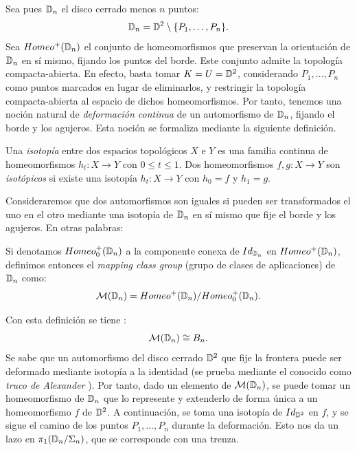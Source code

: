 \documentclass[TFG.tex]{subfiles}
\begin{document}
Sea pues $\mathbb{D}_n$ el disco cerrado menos $n$ puntos:
$$\mathbb{D}_n=\mathbb{D}^2\setminus\{P_1,\dots, P_n\}.$$
Sea $Homeo^+(\mathbb{D}_n)$ el conjunto de homeomorfismos que preservan la orientación de $\mathbb{D}_n$ en sí mismo, fijando los puntos del borde. Este conjunto admite la topología compacta-abierta. En efecto, basta tomar $K=U=\mathbb{D}^2$, considerando $P_1,\dots, P_n$ como puntos marcados en lugar de eliminarlos, y restringir la topología compacta-abierta al espacio de dichos homeomorfismos. Por tanto, tenemos una noción natural de \emph{deformación continua} de un automorfismo de $\mathbb{D}_n$, fijando el borde y los agujeros. Esta noción se formaliza mediante la siguiente definición.

\begin{defi}
Una \emph{isotopía} entre dos espacios topológicos $X$ e $Y$ es una familia continua de homeomorfismos $h_t:X\to Y$ con $0\leq t\leq 1$. Dos homeomorfismos $f,g:X\to Y$ son \emph{isotópicos} si existe una isotopía $h_t:X\to Y$ con $h_0=f$ y $h_1=g$. 
\end{defi}

Consideraremos que dos automorfismos son iguales si pueden ser transformados el uno en el otro mediante una isotopía de $\mathbb{D}_n$ en sí mismo que fije el borde y los agujeros. En otras palabras:

\begin{defi} Si denotamos $Homeo^+_0(\mathbb{D}_n)$ a la componente conexa de $Id_{\mathbb{D}_n}$ en $Homeo^+(\mathbb{D}_n)$, definimos entonces el \emph{mapping class group} (grupo de clases de aplicaciones) de $\mathbb{D}_n$ como:
$$\mathcal{M}(\mathbb{D}_n)=Homeo^+(\mathbb{D}_n)/Homeo^+_0(\mathbb{D}_n).$$
\end{defi}

Con esta definición se tiene \cite{Magnus}:
$$\mathcal{M}(\mathbb{D}_n)\cong B_n.$$
Se sabe que un automorfismo del disco cerrado $\mathbb{D}^2$ que fije la frontera puede ser deformado mediante isotopía a la identidad (se prueba mediante el conocido como \emph{truco de Alexander} \cite{Alexander}). Por tanto, dado un elemento de $\mathcal{M}(\mathbb{D}_n)$, se puede tomar un homeomorfismo de $\mathbb{D}_n$ que lo represente y extenderlo de forma única a un homeomorfismo $f$ de $\mathbb{D}^2$. A continuación, se toma una isotopía de $Id_{\mathbb{D}^2}$ en $f$, y se sigue el camino de los puntos $P_1,\dots, P_n$ durante la deformación. Esto nos da un lazo en $\pi_1(\mathbb{D}_n/\Sigma_n)$, que se corresponde con una trenza. 


\end{document}
